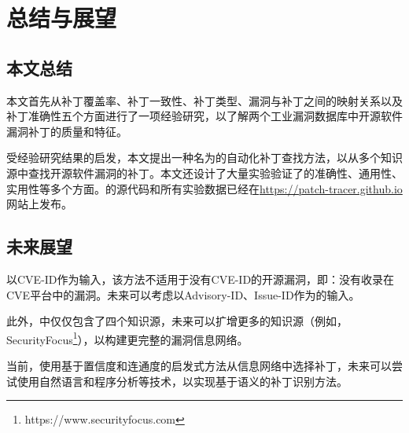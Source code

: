 \chapter{总结与展望}


\section{本文总结}
本文首先从补丁覆盖率、补丁一致性、补丁类型、漏洞与补丁之间的映射关系以及补丁准确性五个方面进行了一项经验研究，以了解两个工业漏洞数据库中开源软件漏洞补丁的质量和特征。

受经验研究结果的启发，本文提出一种名为\tool 的自动化补丁查找方法，以从多个知识源中查找开源软件漏洞的补丁。本文还设计了大量实验验证了\tool 的准确性、通用性、实用性等多个方面。\tool 的源代码和所有实验数据已经在\url{https://patch-tracer.github.io}网站上发布。

\section{未来展望}

\tool 以CVE-ID作为输入，该方法不适用于没有CVE-ID的开源漏洞，即：没有收录在CVE平台中的漏洞。未来可以考虑以Advisory-ID、Issue-ID作为\tool 的输入。

此外，\tool 中仅仅包含了四个知识源，未来可以扩增更多的知识源（例如，SecurityFocus\footnote{https://www.securityfocus.com}），以构建更完整的漏洞信息网络。

当前，\tool 使用基于置信度和连通度的启发式方法从信息网络中选择补丁，未来可以尝试使用自然语言和程序分析等技术，以实现基于语义的补丁识别方法。
